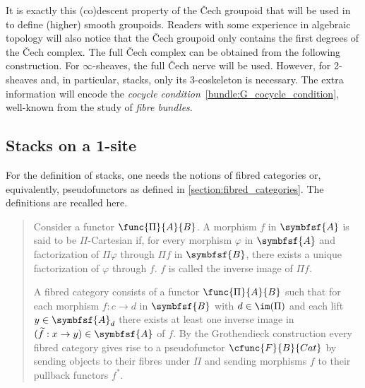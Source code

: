         It is exactly this (co)descent property of the \v{C}ech groupoid that will be used in  to define (higher) smooth groupoids. Readers with some experience in algebraic topology will also notice that the \v{C}ech groupoid only contains the first degrees of the \v{C}ech complex. The full \v{C}ech complex can be obtained from the following construction.
        For $\infty$-sheaves, the full \v{C}ech nerve will be used. However, for 2-sheaves and, in particular, stacks, only its 3-coskeleton is necessary. The extra information will encode the \textit{cocycle condition}~\eqref{bundle:G_cocycle_condition}, well-known from the study of \textit{fibre bundles}.
    
    \subsection{Stacks on a 1-site}
    
        For the definition of stacks, one needs the notions of fibred categories or, equivalently, pseudofunctors as defined in \cref{section:fibred_categories}. The definitions are recalled here.
        \begin{quote}
            Consider a functor $\func{\Pi}{A}{B}$. A morphism $f$ in $\symbfsf{A}$ is said to be $\Pi$-Cartesian if, for every morphism $\varphi$ in $\symbfsf{A}$ and factorization of $\Pi\varphi$ through $\Pi f$ in $\symbfsf{B}$, there exists a unique factorization of $\varphi$ through $f$. $f$ is called the inverse image of $\Pi f$.
    
            A fibred category consists of a functor $\func{\Pi}{A}{B}$ such that for each morphism $f:c\rightarrow d$ in $\symbfsf{B}$ with $d\in\im(\Pi)$ and each lift $y\in\symbfsf{A}_d$ there exists at least one inverse image in $(\widetilde{f}:x\rightarrow y)\in\symbfsf{A}$ of $f$. By the Grothendieck construction every fibred category gives rise to a pseudofunctor $\cfunc{F}{B}{Cat}$ by sending objects to their fibres under $\Pi$ and sending morphisms $f$ to their pullback functors $f^*$.
        \end{quote}
    
